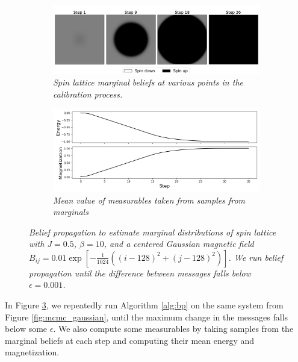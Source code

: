 \documentclass{article}
\begin{document}
\begin{figure}
    \begin{subfigure}{\textwidth}
        \includegraphics[width=\textwidth]{report_bp_gaussian}
        \centering
        \caption{\textit{
            Spin lattice marginal beliefs at various points in the calibration 
            process. 
        }}
        \label{fig:bp_gaussian_a}
    \end{subfigure}
    \begin{subfigure}{\textwidth}
        \includegraphics[width=\textwidth]{report_bp_gaussian_measurables}
        \centering
        \caption{\textit{Mean value of measurables taken from samples from marginals}}
        \label{fig:bp_gaussian_b}
    \end{subfigure}
    \centering
    \caption{\textit{
        Belief propagation to estimate marginal distributions of spin lattice 
        with $J = 0.5$, $\beta = 10$, and a centered Gaussian 
        magnetic field
        $B_{ij} = 0.01 \exp [-\frac{1}{1024}((i-128)^2 + (j-128)^2)]$. 
        We run belief propagation until the difference between messages falls 
        below $\epsilon = 0.001$. 
    }}
    \label{fig:bp_gaussian}
\end{figure}
In Figure \ref{fig:bp_gaussian}, we repeatedly run Algorithm \ref{alg:bp} on the 
same system from Figure \ref{fig:mcmc_gaussian}, until the maximum change in the 
messages falls below some $\epsilon$. 
We also compute some measurables by taking samples from the marginal beliefs at 
each step and computing their mean energy and magnetization. 
\end{document}
